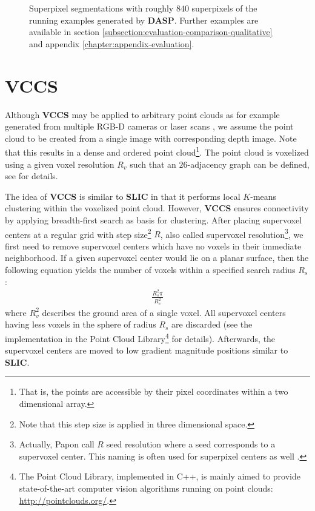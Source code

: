 \begin{figure}[t]
{	}
	\caption[Superpixel segmentations of the running examples generated by \textbf{DASP} \cite{WeikersdorferGossowBeetz:2012}.]{Superpixel segmentations with roughly $840$ superpixels of the running examples generated by \textbf{DASP}. Further examples are available in section \ref{subsection:evaluation-comparison-qualitative} and appendix \ref{chapter:appendix-evaluation}.}
	\label{fig:superpixel-segmentation-depth-dasp-comparison}
\end{figure}

\section{VCCS}
\label{section:superpixel-segmentation-depth-vccs}

Although \textbf{VCCS} may be applied to arbitrary point clouds as for example generated from multiple RGB-D cameras or laser scans \cite{PaponAbramovSchoelerWoergoetter:2013}, we assume the point cloud to be created from a single image with corresponding depth image. Note that this results in a dense and ordered point cloud\footnote{That is, the points are accessible by their pixel coordinates within a two dimensional array.}. The point cloud is voxelized using a given voxel resolution $R_v$ such that an $26$-adjacency graph can be defined, see \cite{Rusu:2009} for details.

The idea of \textbf{VCCS} is similar to \textbf{SLIC} in that it performs local $K$-means clustering within the voxelized point cloud. However, \textbf{VCCS} ensures connectivity by applying breadth-first search as basis for clustering. After placing supervoxel centers at a regular grid with step size\footnote{Note that this step size is applied in three dimensional space.} $R$, also called supervoxel resolution\footnote{Actually, Papon \etal \cite{PaponAbramovSchoelerWoergoetter:2013} call $R$ seed resolution where a seed corresponds to a supervoxel center. This naming is often used for superpixel centers as well \cite{AchantaShajiSmithLucchiFuaSuesstrunk:2010}.}, we first need to remove supervoxel centers which have no voxels in their immediate neighborhood. If a given supervoxel center would lie on a planar surface, then the following equation yields the number of voxels within a specified search radius $R_s$:
\begin{align}
	\frac{R_s^2 \pi}{R_v^2}
\end{align}
where $R_v^2$ describes the ground area of a single voxel. All supervoxel centers having less voxels in the sphere of radius $R_s$ are discarded (see the implementation in the Point Cloud Library\footnote{The Point Cloud Library, implemented in C++, is mainly aimed to provide state-of-the-art computer vision algorithms running on point clouds: \url{http://pointclouds.org/}.} \cite{RusuCousins:2011} for details). Afterwards, the supervoxel centers are moved to low gradient magnitude positions similar to \textbf{SLIC}.%

